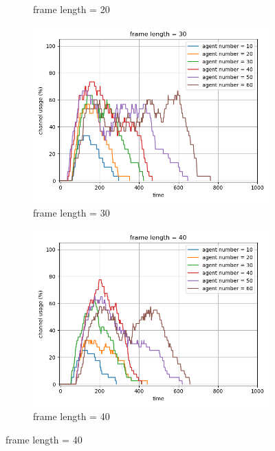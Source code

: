 \begin{figure}[htbp]
\begin{subfigure}[t]{0.45\linewidth}
        \caption{frame length = 20}
        \label{fig:framepercent2}
    \end{subfigure}
    
    \vspace{1cm}
    
    \begin{subfigure}[t]{0.45\linewidth}
        \centering
        \includegraphics[width=\linewidth]{figures/channel_usage_frame30.png}
        \caption{frame length = 30}
        \label{fig:framepercent3}
    \end{subfigure}
    \hfill
    \begin{subfigure}[t]{0.45\linewidth}
        \centering
        \includegraphics[width=\linewidth]{figures/channel_usage_frame40.png}
        \caption{frame length = 40}
        \label{fig:framepercent4}
    \end{subfigure}
    

\end{figure}

